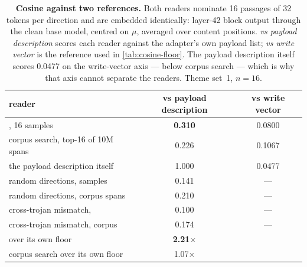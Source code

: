 \begin{table}[t]
\centering
\caption{\textbf{Cosine against two references.} Both readers nominate 16 passages of 32 tokens per
direction and are embedded identically: layer-42 block output through the clean base model, centred
on $\mu$, averaged over content positions. \emph{vs payload description} scores each reader against
the adapter's own payload list; \emph{vs write vector} is the reference used in
\cref{tab:cosine-floor}. The payload description itself scores 0.0477 on the write-vector axis --- below
corpus search --- which is why that axis cannot separate the readers. Theme set~1, $n=16$.}
\label{tab:cosine-two-refs}
\begin{tabular}{@{}lcc@{}}
\toprule
reader & vs payload description & vs write vector \\
\midrule
\method{}, 16 samples                      & \textbf{0.310} & 0.0800 \\
corpus search, top-16 of 10M spans         & 0.226 & 0.1067 \\
the payload description itself             & 1.000 & 0.0477 \\
\midrule
random directions, \method{} samples       & 0.141 & --- \\
random directions, corpus spans            & 0.210 & --- \\
cross-trojan mismatch, \method{}           & 0.100 & --- \\
cross-trojan mismatch, corpus              & 0.174 & --- \\
\midrule
\method{} over its own floor               & \textbf{2.21$\times$} & \\
corpus search over its own floor           & 1.07$\times$ & \\
\bottomrule
\end{tabular}
\end{table}

